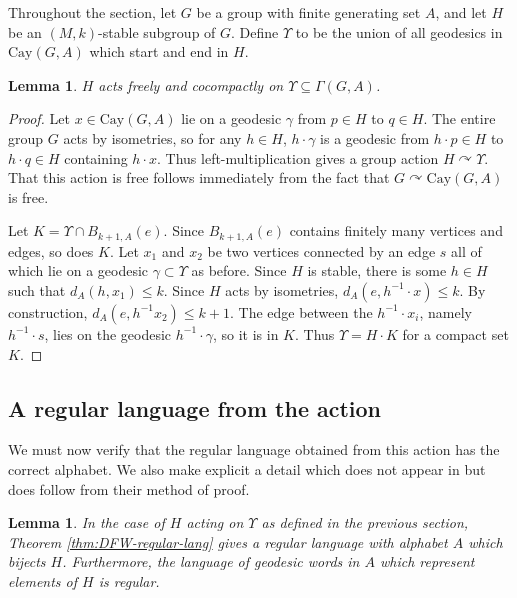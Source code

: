 \documentclass[11pt,letterpaper]{amsart}
\newtheorem{lemma}[theorem]{Lemma}
\theoremstyle{definition}
\theoremstyle{plain}
\theoremstyle{TheoremNum}
\begin{document}
Throughout the section, let $G$ be a group with finite generating set $A$, and let $H$ be an $(M,k)$-stable subgroup of $G$. Define $\Upsilon$ to be the union of all geodesics in $\text{Cay}(G,A)$ which start and end in $H$. 
\begin{lemma}
    $H$ acts freely and cocompactly on $\Upsilon \subseteq \Gamma(G,A)$.
\end{lemma}
\begin{proof}
    Let $x \in \text{Cay}(G,A)$ lie on a geodesic $\gamma$ from $p \in H$ to $q \in H$. The entire group $G$ acts by isometries, so for any $h \in H$, $h \cdot \gamma$ is a geodesic from $h \cdot p \in H$ to $h \cdot q \in H$ containing $h \cdot x$. Thus left-multiplication gives a group action $H \curvearrowright \Upsilon$. That this action is free follows immediately from the fact that $G \curvearrowright \text{Cay}(G,A)$ is free.
    
    Let $K = \Upsilon \cap B_{k+1, A}(e)$. Since $B_{k+1, A}(e)$ contains finitely many vertices and edges, so does $K$. Let $x_1$ and $x_2$ be two vertices connected by an edge $s$ all of which lie on a geodesic $\gamma \subset \Upsilon$ as before. Since $H$ is stable, there is some $h \in H$ such that $d_A (h, x_1) \leq k$. Since $H$ acts by isometries, $d_A (e, h^{-1} \cdot x) \leq k$. By construction, $d_A (e , h^{-1} x_2) \leq k+1$. The edge between the $h^{-1} \cdot x_i$, namely $h^{-1} \cdot s$, lies on the geodesic $h^{-1} \cdot \gamma$, so it is in $K$. Thus $\Upsilon = H \cdot K$ for a compact set $K$.
\end{proof}

\subsection{A regular language from the action}\label{subsec:regular-language-alphabet}
    We must now verify that the regular language obtained from this action has the correct alphabet. We also make explicit a detail which does not appear in \cite[Theorem~6.7]{DFW} but does follow from their method of proof.
    \begin{lemma}\label{lem:right-alphabet}
        In the case of $H$ acting on $\Upsilon$ as defined in the previous section, Theorem \ref{thm:DFW-regular-lang} gives a regular language with alphabet $A$ which bijects $H$. Furthermore, the language of geodesic words in $A$ which represent elements of $H$ is regular.
    \end{lemma}
\end{document}
